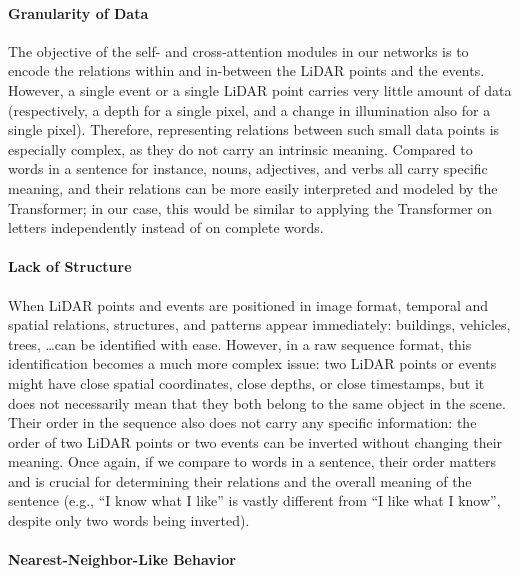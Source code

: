 \paragraph{Granularity of Data}
The objective of the self- and cross-attention modules in our networks is to encode the relations within and in-between the LiDAR points and the events. However, a single event or a single LiDAR point carries very little amount of data (respectively, a depth for a single pixel, and a change in illumination also for a single pixel). Therefore, representing relations between such small data points is especially complex, as they do not carry an intrinsic meaning. Compared to words in a sentence for instance, nouns, adjectives, and verbs all carry specific meaning, and their relations can be more easily interpreted and modeled by the Transformer; in our case, this would be similar to applying the Transformer on letters independently instead of on complete words.

\paragraph{Lack of Structure}
When LiDAR points and events are positioned in image format, temporal and spatial relations, structures, and patterns appear immediately: buildings, vehicles, trees, \dots can be identified with ease. However, in a raw sequence format, this identification becomes a much more complex issue: two LiDAR points or events might have close spatial coordinates, close depths, or close timestamps, but it does not necessarily mean that they both belong to the same object in the scene. Their order in the sequence also does not carry any specific information: the order of two LiDAR points or two events can be inverted without changing their meaning. Once again, if we compare to words in a sentence, their order matters and is crucial for determining their relations and the overall meaning of the sentence (e.g., ``I know what I like'' is vastly different from ``I like what I know'', despite only two words being inverted).

\paragraph{Nearest-Neighbor-Like Behavior}

